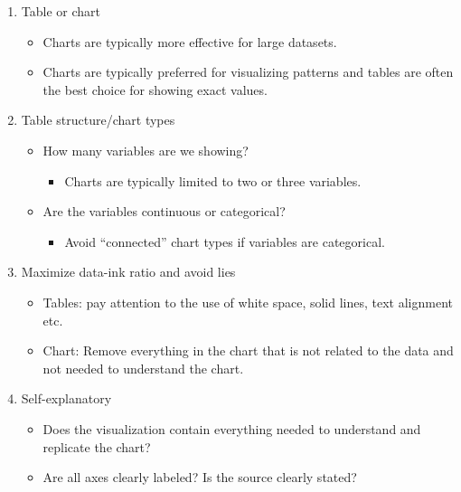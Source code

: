 \documentclass[]{book}
\providecommand{\tightlist}{%
  \setlength{\itemsep}{0pt}\setlength{\parskip}{0pt}}
\begin{document}
\begin{enumerate}
\def\labelenumi{\arabic{enumi}.}
\item
  Table or chart

  \begin{itemize}
  \tightlist
  \item
    Charts are typically more effective for large datasets.
  \item
    Charts are typically preferred for visualizing patterns and tables are often the best choice for showing exact values.
  \end{itemize}
\item
  Table structure/chart types

  \begin{itemize}
  \tightlist
  \item
    How many variables are we showing?

    \begin{itemize}
    \tightlist
    \item
      Charts are typically limited to two or three variables.
    \end{itemize}
  \item
    Are the variables continuous or categorical?

    \begin{itemize}
    \tightlist
    \item
      Avoid ``connected'' chart types if variables are categorical.
    \end{itemize}
  \end{itemize}
\item
  Maximize data-ink ratio and avoid lies

  \begin{itemize}
  \tightlist
  \item
    Tables: pay attention to the use of white space, solid lines, text alignment etc.
  \item
    Chart: Remove everything in the chart that is not related to the data and not needed to understand the chart.
  \end{itemize}
\item
  Self-explanatory

  \begin{itemize}
  \tightlist
  \item
    Does the visualization contain everything needed to understand and replicate the chart?
  \item
    Are all axes clearly labeled? Is the source clearly stated?
  \end{itemize}
\end{enumerate}
\end{document}
